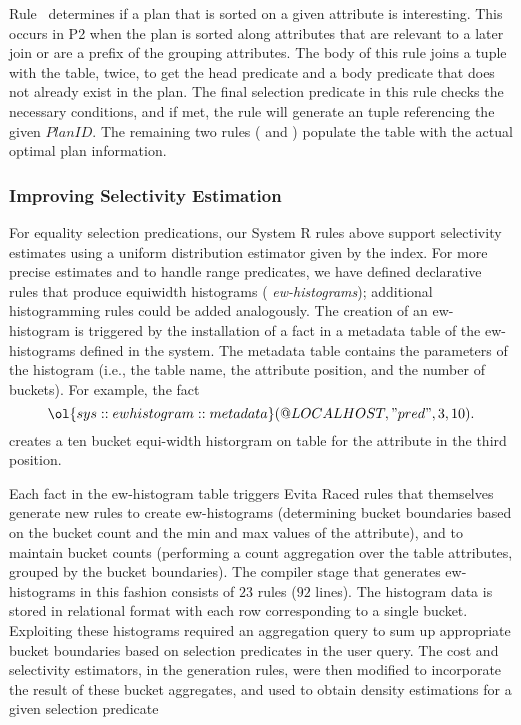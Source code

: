 Rule~ determines if a plan that is sorted on a given attribute is
interesting.  This occurs in P2 when the plan is sorted along attributes that
are relevant to a later join or are a prefix of the grouping attributes.  The
body of this rule joins a  tuple with the  table, twice,
to get the head predicate and a body predicate that does not already exist in
the plan.  The final selection predicate in this rule checks the necessary
conditions, and if met, the rule will generate an  tuple
referencing the given $PlanID$.  The remaining two rules ( and
) populate the  table with the actual optimal plan
information.

\subsubsection{Improving Selectivity Estimation}

For equality selection predications, our System R rules above support
selectivity estimates using a uniform distribution estimator given by the
index.  For more precise estimates and to handle range predicates, we have
defined declarative rules that produce equiwidth histograms ({\em
ew-histograms}); additional histogramming rules could be added analogously.
The creation of an ew-histogram is triggered by the installation of a fact in a
metadata table of the ew-histograms defined in the system.  The metadata table
contains the parameters of the histogram (i.e., the table name, the attribute
position, and the number of buckets).  For example, the fact \[
\ol{sys::ewhistogram::metadata}(@LOCALHOST, "pred", 3, 10).  \] creates a ten
bucket equi-width historgram on table  for the attribute in the third
position.

Each fact in the ew-histogram table triggers Evita Raced rules that themselves
generate new rules to create ew-histograms (determining bucket boundaries based
on the bucket count and the min and max values of the attribute), and to
maintain bucket counts (performing a count aggregation over the table
attributes, grouped by the bucket boundaries).  The compiler stage that
generates ew-histograms in this fashion consists of $23$ rules ($92$ lines).
The histogram data is stored in relational format with each row corresponding
to a single bucket.  Exploiting these histograms required an aggregation query
to sum up appropriate bucket boundaries based on selection predicates
in the user query.  The cost and selectivity estimators, in the 
generation rules, were then modified to incorporate the result of these bucket
aggregates, and used to obtain density estimations for a given selection
predicate

